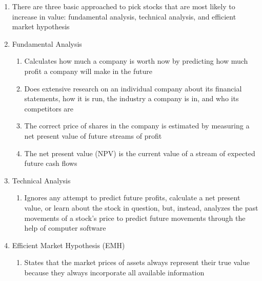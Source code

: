 \documentclass[12pt]{article}
\begin{document}
\begin{enumerate}
\begin{enumerate}
          \item There are three basic approached to pick stocks that are most likely to increase in value: fundamental analysis, technical analysis, and efficient market hypothesis

          \item Fundamental Analysis

            \begin{enumerate}

              \item Calculates how much a company is worth now by predicting how much profit a company will make in the future

              \item Does extensive research on an individual company about its financial statements, how it is run, the industry a company is in, and who its competitors are

              \item The correct price of shares in the company is estimated by measuring a net present value of future streams of profit

              \item The net present value (NPV) is the current value of a stream of expected future cash flows

            \end{enumerate}

          \item Technical Analysis

            \begin{enumerate}

              \item Ignores any attempt to predict future profits, calculate a net present value, or learn about the stock in question, but, instead, analyzes the past movements of a stock's price to predict future movements through the help of computer software

            \end{enumerate}

          \item Efficient Market Hypothesis (EMH)

            \begin{enumerate}

              \item States that the market prices of assets always represent their true value because they always incorporate all available information


\end{enumerate}
\end{enumerate}
\end{enumerate}
\end{document}
